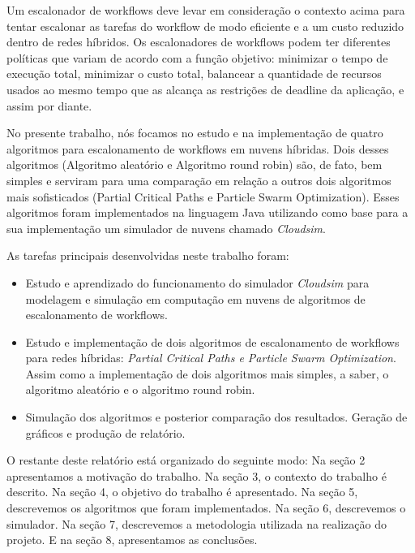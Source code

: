 \documentclass[a4paper,10pt]{article}
\begin{document}
Um escalonador de workflows deve levar em consideração o contexto acima para tentar escalonar as tarefas do workflow de modo 
eficiente e a um custo reduzido dentro de redes híbridos. Os escalonadores de workflows podem ter diferentes políticas que 
variam de acordo com a função objetivo: minimizar o tempo de execução total, minimizar o custo total, balancear a quantidade de recursos 
usados ao mesmo tempo que as alcança as restrições de deadline da aplicação, e assim por diante.

No presente trabalho, nós focamos no estudo e na implementação de quatro algoritmos para escalonamento de workflows em nuvens híbridas. 
Dois desses algoritmos (Algoritmo aleatório e Algoritmo round robin) são, de fato, bem simples e serviram para uma comparação em relação a outros dois 
algoritmos mais sofisticados (Partial Critical Paths e Particle Swarm Optimization). Esses algoritmos foram implementados na linguagem Java utilizando como base para 
a sua implementação um simulador de nuvens chamado \emph{Cloudsim}\cite{cloudsim}.

As tarefas principais desenvolvidas neste trabalho foram:

\begin{itemize}

\item Estudo e aprendizado do funcionamento do simulador \emph{Cloudsim} para modelagem e simulação em computação em nuvens de 
algoritmos de escalonamento de workflows.

\item Estudo e implementação de dois algoritmos de escalonamento de workflows para redes híbridas: \emph{Partial Critical Paths e
Particle Swarm Optimization}. Assim como a implementação de dois algoritmos mais simples, a saber, o algoritmo aleatório e o 
algoritmo round robin.

\item Simulação dos algoritmos e posterior comparação dos resultados. Geração de gráficos e produção de relatório.

\end{itemize}


O restante deste relatório está organizado do seguinte modo: Na seção 2 apresentamos a motivação do trabalho. Na seção 3, o contexto 
do trabalho é descrito. Na seção 4, o objetivo do trabalho é apresentado. Na seção 5, descrevemos os algoritmos que foram implementados. 
Na seção 6, descrevemos o simulador. Na seção 7, descrevemos a metodologia utilizada na realização do projeto. E na seção 8, apresentamos as conclusões.
\end{document}
